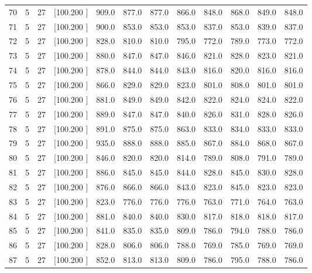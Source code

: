\documentclass[12pt,a4paper]{article}
\begin{document}
\begin{center}
{\begin{tabular}{r r r r r r r r r r r r}
  70&  5& 27&[100.200   ]&   909.0&   877.0&   877.0&   866.0&   848.0&   868.0&   849.0&   848.0\\[-0.02in]
  71&  5& 27&[100.200   ]&   900.0&   853.0&   853.0&   853.0&   837.0&   853.0&   839.0&   837.0\\[-0.02in]
  72&  5& 27&[100.200   ]&   828.0&   810.0&   810.0&   795.0&   772.0&   789.0&   773.0&   772.0\\[-0.02in]
  73&  5& 27&[100.200   ]&   880.0&   847.0&   847.0&   846.0&   821.0&   828.0&   823.0&   821.0\\[-0.02in]
  74&  5& 27&[100.200   ]&   878.0&   844.0&   844.0&   843.0&   816.0&   820.0&   816.0&   816.0\\[-0.02in]
  75&  5& 27&[100.200   ]&   866.0&   829.0&   829.0&   823.0&   801.0&   808.0&   801.0&   801.0\\[-0.02in]
  76&  5& 27&[100.200   ]&   881.0&   849.0&   849.0&   842.0&   822.0&   824.0&   824.0&   822.0\\[-0.02in]
  77&  5& 27&[100.200   ]&   889.0&   847.0&   847.0&   840.0&   826.0&   831.0&   828.0&   826.0\\[-0.02in]
  78&  5& 27&[100.200   ]&   891.0&   875.0&   875.0&   863.0&   833.0&   834.0&   833.0&   833.0\\[-0.02in]
  79&  5& 27&[100.200   ]&   935.0&   888.0&   888.0&   885.0&   867.0&   884.0&   868.0&   867.0\\[-0.02in]
  80&  5& 27&[100.200   ]&   846.0&   820.0&   820.0&   814.0&   789.0&   808.0&   791.0&   789.0\\[-0.02in]
  81&  5& 27&[100.200   ]&   886.0&   845.0&   845.0&   844.0&   828.0&   845.0&   830.0&   828.0\\[-0.02in]
  82&  5& 27&[100.200   ]&   876.0&   866.0&   866.0&   843.0&   823.0&   845.0&   823.0&   823.0\\[-0.02in]
  83&  5& 27&[100.200   ]&   823.0&   776.0&   776.0&   776.0&   763.0&   771.0&   764.0&   763.0\\[-0.02in]
  84&  5& 27&[100.200   ]&   881.0&   840.0&   840.0&   830.0&   817.0&   818.0&   818.0&   817.0\\[-0.02in]
  85&  5& 27&[100.200   ]&   841.0&   835.0&   835.0&   809.0&   786.0&   794.0&   788.0&   786.0\\[-0.02in]
  86&  5& 27&[100.200   ]&   828.0&   806.0&   806.0&   788.0&   769.0&   785.0&   769.0&   769.0\\[-0.02in]
  87&  5& 27&[100.200   ]&   852.0&   813.0&   813.0&   809.0&   786.0&   795.0&   788.0&   786.0\\[-0.02in]

\end{tabular}}
\end{center}
\end{document}
